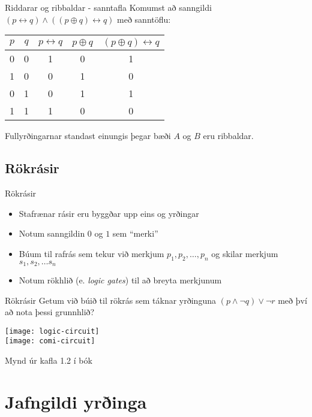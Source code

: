 \documentclass{beamer}
\begin{document}
\begin{frame}{Riddarar og ribbaldar - sanntafla}
Komumst að sanngildi $(p \leftrightarrow q) \land ((p \oplus q) \leftrightarrow q)$ með sanntöflu:
\begin{center}
\begin{tabular}{ccccc}
\toprule
$p$&$q$&$p \leftrightarrow q$&$p \oplus q$& $(p \oplus q) \leftrightarrow q$\\
\midrule
0&0&1&0&1\\
1&0&0&1&0\\
0&1&0&1&1\\
1&1&1&0&0\\
\bottomrule
\end{tabular}
\end{center}\pause
Fullyrðingarnar standast einungis þegar bæði $A$ og $B$ eru ribbaldar.
\end{frame}

\subsection{Rökrásir}

\begin{frame}{Rökrásir}
\begin{itemize}
 \item Stafrænar rásir eru byggðar upp eins og yrðingar
 \item Notum sanngildin $0$ og $1$ sem ``merki''
 \item Búum til rafrás sem tekur við merkjum $p_1, p_2, \ldots, p_n$ og skilar merkjum $s_1, s_2, \ldots s_n$
 
 \item Notum rökhlið (e. \emph{logic gates}) til að breyta merkjunum
\end{itemize}
\end{frame}

\begin{frame}{Rökrásir}
Getum við búið til rökrás sem táknar yrðinguna $(p \land \lnot q) \lor \lnot r$ með því að nota þessi grunnhlið?
\begin{center}
\texttt{[image: logic-circuit]}\\
\pause
\texttt{[image: comi-circuit]}
\end{center}
Mynd úr kafla 1.2 í bók
\end{frame}

\section{Jafngildi yrðinga}
\end{document}
